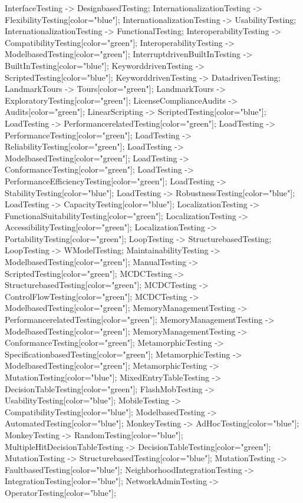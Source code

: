 \documentclass{article}
\begin{document}
{InterfaceTesting -> DesignbasedTesting;
InternationalizationTesting -> FlexibilityTesting[color="blue"];
InternationalizationTesting -> UsabilityTesting;
InternationalizationTesting -> FunctionalTesting;
InteroperabilityTesting -> CompatibilityTesting[color="green"];
InteroperabilityTesting -> ModelbasedTesting[color="green"];
InterruptdrivenBuiltInTesting -> BuiltInTesting[color="blue"];
KeyworddrivenTesting -> ScriptedTesting[color="blue"];
KeyworddrivenTesting -> DatadrivenTesting;
LandmarkTours -> Tours[color="green"];
LandmarkTours -> ExploratoryTesting[color="green"];
LicenseComplianceAudits -> Audits[color="green"];
LinearScripting -> ScriptedTesting[color="blue"];
LoadTesting -> PerformancerelatedTesting[color="green"];
LoadTesting -> PerformanceTesting[color="green"];
LoadTesting -> ReliabilityTesting[color="green"];
LoadTesting -> ModelbasedTesting[color="green"];
LoadTesting -> ConformanceTesting[color="green"];
LoadTesting -> PerformanceEfficiencyTesting[color="green"];
LoadTesting -> StabilityTesting[color="blue"];
LoadTesting -> RobustnessTesting[color="blue"];
LoadTesting -> CapacityTesting[color="blue"];
LocalizationTesting -> FunctionalSuitabilityTesting[color="green"];
LocalizationTesting -> AccessibilityTesting[color="green"];
LocalizationTesting -> PortabilityTesting[color="green"];
LoopTesting -> StructurebasedTesting;
LoopTesting -> WModelTesting;
MaintainabilityTesting -> ModelbasedTesting[color="green"];
ManualTesting -> ScriptedTesting[color="green"];
MCDCTesting -> StructurebasedTesting[color="green"];
MCDCTesting -> ControlFlowTesting[color="green"];
MCDCTesting -> ModelbasedTesting[color="green"];
MemoryManagementTesting -> PerformancerelatedTesting[color="green"];
MemoryManagementTesting -> ModelbasedTesting[color="green"];
MemoryManagementTesting -> ConformanceTesting[color="green"];
MetamorphicTesting -> SpecificationbasedTesting[color="green"];
MetamorphicTesting -> ModelbasedTesting[color="green"];
MetamorphicTesting -> MutationTesting[color="blue"];
MixedEntryTableTesting -> DecisionTableTesting[color="green"];
FlashMobTesting -> UsabilityTesting[color="blue"];
MobileTesting -> CompatibilityTesting[color="blue"];
ModelbasedTesting -> AutomatedTesting[color="blue"];
MonkeyTesting -> AdHocTesting[color="blue"];
MonkeyTesting -> RandomTesting[color="blue"];
MultipleHitDecisionTableTesting -> DecisionTableTesting[color="green"];
MutationTesting -> StructurebasedTesting[color="blue"];
MutationTesting -> FaultbasedTesting[color="blue"];
NeighborhoodIntegrationTesting -> IntegrationTesting[color="blue"];
NetworkAdminTesting -> OperatorTesting[color="blue"];
}
\end{document}
